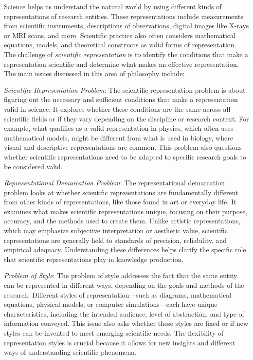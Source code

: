 Science helps us understand the natural world by using different kinds of representations of research entities. These representations include measurements from scientific instruments, descriptions of observations, digital images like X-rays or MRI scans, and more. Scientific practice also often considers mathematical equations, models, and theoretical constructs as valid forms of representation. The challenge of \emph{scientific representation} is to identify the conditions that make a representation scientific and determine what makes an effective representation. The main issues discussed in this area of philosophy include:

\emph{Scientific Representation Problem}: The scientific representation problem is about figuring out the necessary and sufficient conditions that make a representation valid in science. It explores whether these conditions are the same across all scientific fields or if they vary depending on the discipline or research context. For example, what qualifies as a valid representation in physics, which often uses mathematical models, might be different from what is used in biology, where visual and descriptive representations are common. This problem also questions whether scientific representations need to be adapted to specific research goals to be considered valid.

\emph{Representational Demarcation Problem}: The representational demarcation problem looks at whether scientific representations are fundamentally different from other kinds of representations, like those found in art or everyday life. It examines what makes scientific representations unique, focusing on their purpose, accuracy, and the methods used to create them. Unlike artistic representations, which may emphasize subjective interpretation or aesthetic value, scientific representations are generally held to standards of precision, reliability, and empirical adequacy. Understanding these differences helps clarify the specific role that scientific representations play in knowledge production.

\emph{Problem of Style}: The problem of style addresses the fact that the same entity can be represented in different ways, depending on the goals and methods of the research. Different styles of representation—such as diagrams, mathematical equations, physical models, or computer simulations—each have unique characteristics, including the intended audience, level of abstraction, and type of information conveyed. This issue also asks whether these styles are fixed or if new styles can be invented to meet emerging scientific needs. The flexibility of representation styles is crucial because it allows for new insights and different ways of understanding scientific phenomena.

